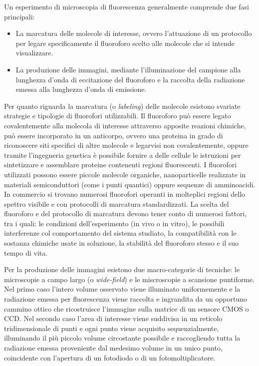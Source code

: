 Un esperimento di microscopia di fluorescenza generalmente
comprende due fasi principali:
\begin{itemize}
    \item La marcatura delle molecole di interesse, ovvero
        l'attuazione di un protocollo per legare specificamente il
        fluoroforo scelto alle molecole che si intende visualizzare.
    \item La produzione delle immagini, mediante l'illuminazione del
        campione alla lunghezza d'onda di eccitazione del fluoroforo
        e la raccolta della radiazione emessa alla lunghezza d'onda
        di emissione.
\end{itemize}

Per quanto riguarda la marcatura (o \textit{labeling}) delle
molecole esistono svariate strategie e tipologie di fluorofori
utilizzabili. Il fluoroforo può essere legato covalentemente alla
molecola di interesse attraverso apposite reazioni chimiche,
può essere incorporato in un anticorpo, ovvero una proteina
in grado di riconoscere siti specifici di altre molecole e legarvisi
non covalentemente, oppure tramite l'ingegneria genetica è possibile
fornire a delle cellule le istruzioni per sintetizzare e assemblare
proteine contenenti regioni fluorescenti.
I fluorofori utilizzati possono essere piccole molecole organiche,
nanoparticelle realizzate in materiali semiconduttori (come i punti
quantici) oppure sequenze di amminoacidi.
In commercio si trovano numerosi fluorofori operanti in molteplici
regioni dello spettro visibile e con protocolli di marcatura
standardizzati. La scelta del fluoroforo e del protocollo di marcatura
devono tener conto di numerosi fattori, tra i quali: le condizioni
dell'esperimento (in vivo o in vitro), le possibili interferenze col
comportamento del sistema studiato, la compatibilità con le sostanza
chimiche usate in soluzione, la stabilità del fluoroforo stesso e il 
suo tempo di vita.

Per la produzione delle immagini esistono due macro-categorie di
tecniche: le microscopie a campo largo (o \textit{wide-field}) e
le miscroscopie a scansione puntiforme.
Nel primo caso l'intero volume osservato viene illuminato
uniformemente e la radiazione emessa per fluorescenza viene raccolta
e ingrandita da un opportuno cammino ottico che ricostruisce
l'immagine sulla matrice di un sensore CMOS o CCD.
Nel secondo caso l'area di interesse viene suddivisa in un reticolo
tridimensionale di punti e ogni punto viene acquisito sequenzialmente,
illuminando il più piccolo volume circostante possibile e raccogliendo
tutta la radiazione emessa proveniente dal medesimo volume in un
unico punto, coincidente con l'apertura di un fotodiodo o di un
fotomoltiplicatore.

